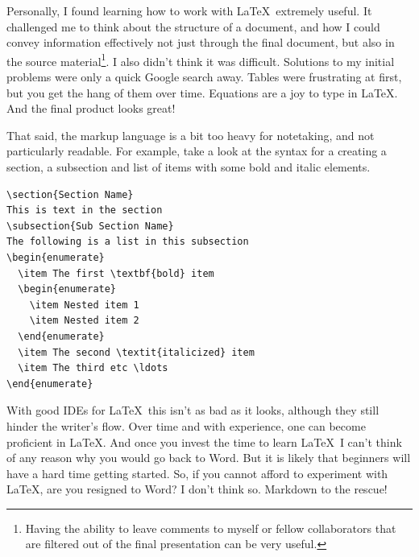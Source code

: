 \documentclass[journal,10pt,final]{IEEEtran}
\begin{document}
Personally, I found learning how to work with \LaTeX~extremely useful.
It challenged me to think about the structure of a document, and how I
could convey information effectively not just through the final
document, but also in the source material\footnote{Having the ability to
  leave comments to myself or fellow collaborators that are filtered out
  of the final presentation can be very useful.}. I also didn't think it
was difficult. Solutions to my initial problems were only a quick Google
search away. Tables were frustrating at first, but you get the hang of
them over time. Equations are a joy to type in \LaTeX. And the final
product looks great!

That said, the markup language is a bit too heavy for notetaking, and
not particularly readable. For example, take a look at the syntax for a
creating a section, a subsection and list of items with some bold and
italic elements.

\begin{verbatim}
\section{Section Name}
This is text in the section
\subsection{Sub Section Name}
The following is a list in this subsection
\begin{enumerate}
  \item The first \textbf{bold} item
  \begin{enumerate}
    \item Nested item 1
    \item Nested item 2
  \end{enumerate}
  \item The second \textit{italicized} item
  \item The third etc \ldots
\end{enumerate}
\end{verbatim}

With good IDEs for \LaTeX~this isn't as bad as it looks, although they
still hinder the writer's flow. Over time and with experience, one can
become proficient in \LaTeX. And once you invest the time to learn
\LaTeX~I can't think of any reason why you would go back to Word. But it
is likely that beginners will have a hard time getting started. So, if
you cannot afford to experiment with \LaTeX, are you resigned to Word? I
don't think so. Markdown to the rescue!
\end{document}
